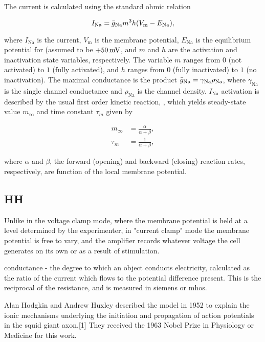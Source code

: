 The \Na current is calculated using the standard ohmic relation 

\begin{equation*}
    I_\mathrm{Na} = \bar{g}_{\mathrm{Na}} m^3 h \qty(V_\mathrm{m} - E_\mathrm{Na}),
\end{equation*}

where $I_\mathrm{Na}$ is the \Na current, $V_\mathrm{m}$ is the membrane potential, $E_\mathrm{Na}$ is the equilibrium potential for \Na (assumed to be $+50\,\mathrm{mV}$, and $m$ and $h$ are the activation and inactivation state variables, respectively. The variable $m$ ranges from $0$ (not activated) to $1$ (fully activated), and $h$ ranges from $0$ (fully inactivated) to $1$ (no inactivation). The maximal conductance is the product $\bar{g}_{\mathrm{Na}} = \gamma_\mathrm{Na} \rho_\mathrm{Na}$, where $\gamma_\mathrm{Na}$ is the single channel conductance and $\rho_\mathrm{Na}$ is the channel density. $I_\mathrm{Na}$ activation is described by the usual first order kinetic reaction, , which yields steady-state value $m_\infty$ and time constant $\tau_m$ given by 

\begin{align*}
    m_\infty &= \frac{\alpha}{\alpha + \beta},
    \\
    \tau_m &= \frac{1}{\alpha + \beta},
\end{align*}

where $\alpha$ and $\beta$, the forward (opening) and backward (closing) reaction rates, respectively, are function of the local membrane potential.

\subsection{HH}

Unlike in the voltage clamp mode, where the membrane potential is held at a level determined by the experimenter, in "current clamp" mode the membrane potential is free to vary, and the amplifier records whatever voltage the cell generates on its own or as a result of stimulation.

conductance - the degree to which an object conducts electricity, calculated as the ratio of the current which flows to the potential difference present. This is the reciprocal of the resistance, and is measured in siemens or mhos.

Alan Hodgkin and Andrew Huxley described the model in 1952 to explain the ionic mechanisms underlying the initiation and propagation of action potentials in the squid giant axon.[1] They received the 1963 Nobel Prize in Physiology or Medicine for this work.

